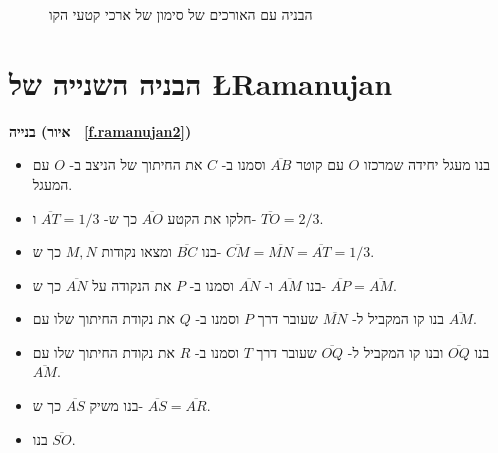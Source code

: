 \begin{figure}
\begin{center}
\end{center}
\caption{הבניה עם האורכים של סימון של ארכי קטעי הקו}\label{f.ramanujan1a}
\end{figure}





\section{הבניה השנייה של
\L{Ramanujan}}\label{s.square-ramanujan-second}

\textbf{%
בנייה (איור%
~\ref{f.ramanujan2})}

\begin{itemize}
\item
בנו מעגל יחידה שמרכזו
$O$
עם קוטר
$\overline{AB}$
וסמנו ב-%
$C$
את החיתוך של הניצב ב-%
$O$
עם המעגל.
\item
חלקו את הקטע
$\overline{AO}$
כך ש-%
$\overline{AT}=1/3$ 
ו-%
$\overline{TO}=2/3$.
\item
בנו
$\overline{BC}$
ומצאו נקודות
$M,N$
כך ש-%
$\overline{CM}=\overline{MN}=\overline{AT}=1/3$.
\item
בנו 
$\overline{AM}$
ו-%
$\overline{AN}$
וסמנו ב-%
$P$
את הנקודה על
$\overline{AN}$
כך ש-%
$\overline{AP}=\overline{AM}$.
\item
בנו קו המקביל ל-%
$\overline{MN}$
שעובר דרך
$P$
וסמנו ב-%
$Q$
את נקודת החיתוך שלו עם
$\overline{AM}$.
\item
בנו
$\overline{OQ}$
ובנו קו המקביל ל-%
$\overline{OQ}$
שעובר דרך 
$T$
וסמנו ב-%
$R$
את נקודת החיתוך שלו עם
$\overline{AM}$.
\item
בנו משיק
$\overline{AS}$
כך ש-%
$\overline{AS}=\overline{AR}$.
\item
בנו
$\overline{SO}$.
\end{itemize}



